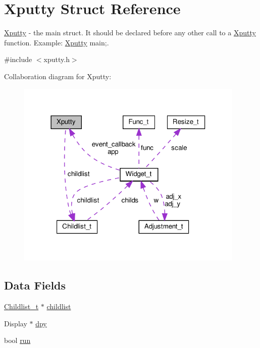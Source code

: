 \hypertarget{structXputty}{}\section{Xputty Struct Reference}
\label{structXputty}


\hyperlink{structXputty}{Xputty} -\/ the main struct. It should be declared before any other call to a \hyperlink{structXputty}{Xputty} function. Example\+: \hyperlink{structXputty}{Xputty} main;.  




{\ttfamily \#include $<$xputty.\+h$>$}



Collaboration diagram for Xputty\+:
\nopagebreak
\begin{figure}[H]
\begin{center}
\leavevmode
\includegraphics[width=309pt]{structXputty__coll__graph}
\end{center}
\end{figure}
\subsection*{Data Fields}
\begin{DoxyCompactItemize}
\item 
\hyperlink{structChildlist__t}{Childlist\+\_\+t} $\ast$ \hyperlink{structXputty_a55fafc08d9702ab14137f52f35c4ff19}{childlist}
\item 
Display $\ast$ \hyperlink{structXputty_ab185ae4fd00ee1930c61e0440734878f}{dpy}
\item 
bool \hyperlink{structXputty_a3a8e0381e77ae9fae69aab5dda8e7e7a}{run}
\end{DoxyCompactItemize}


